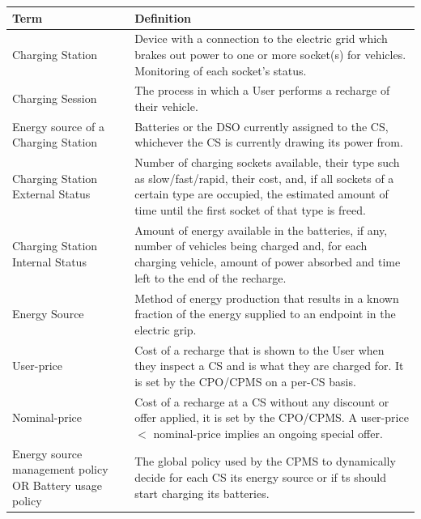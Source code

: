\documentclass[11pt]{article}
\begin{document}
\begin{table}[H]
    \centering
    \setlength{\tabcolsep}{18pt}
    \renewcommand{\arraystretch}{1.2}
    \begin{tabularx}{\textwidth}{|>{\centering\hsize=0.4\hsize}X|>{\hsize=1.6\hsize}X|}
        \hline
        \textbf{Term} & \textbf{Definition} \\
        \hline
        Charging Station & Device with a connection to the electric grid which brakes out power to one or more socket(s) for vehicles. Monitoring of each socket's status. \\
        \hline
        Charging Session & The process in which a User performs a recharge of their vehicle. \\
        \hline
        Energy source of a Charging Station & Batteries or the DSO currently assigned to the CS, whichever the CS is currently drawing its power from. \\
        \hline
        Charging Station External Status & Number of charging sockets available, their type such as slow/fast/rapid, their cost, and, if all sockets of a certain type are occupied, the estimated amount of time until the first socket of that type is freed. \\
        \hline
        Charging Station Internal Status & Amount of energy available in the batteries, if any, number of vehicles being charged and, for each charging vehicle, amount of power absorbed and time left to the end of the recharge. \\
        \hline
        Energy Source & Method of energy production that results in a known fraction of the energy supplied to an endpoint in the electric grip. \\
        \hline
        User-price & Cost of a recharge that is shown to the User when they inspect a CS and is what they are charged for. It is set by the CPO/CPMS on a per-CS basis.\\
        \hline
        Nominal-price & Cost of a recharge at a CS without any discount or offer applied, it is set by the CPO/CPMS. A user-price $<$ nominal-price implies an ongoing special offer. \\
        \hline
        Energy source management policy OR Battery usage policy & The global policy used by the CPMS to dynamically decide for each CS its energy source or if ts should start charging its batteries. \\
        \hline
    \end{tabularx}
    \label{tab:definitions}
\end{table}
\end{document}
